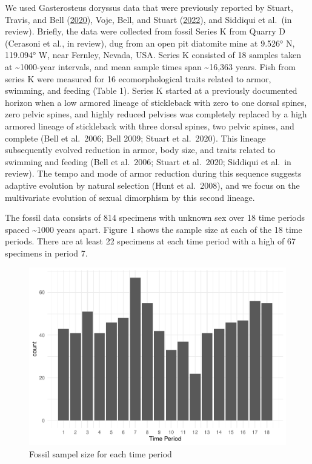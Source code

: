 \documentclass[
  12pt,
]{article}
\begin{document}
We used Gasterosteus doryssus data that were previously reported by
Stuart, Travis, and Bell (\protect\hyperlink{ref-Stuart2020}{2020}),
Voje, Bell, and Stuart (\protect\hyperlink{ref-Voje2022}{2022}), and
Siddiqui et al.~(in review). Briefly, the data were collected from
fossil Series K from Quarry D (Cerasoni et al., in review), dug from an
open pit diatomite mine at 9.526° N, 119.094° W, near Fernley, Nevada,
USA. Series K consisted of 18 samples taken at \textasciitilde1000-year
intervals, and mean sample times span \textasciitilde16,363 years. Fish
from series K were measured for 16 ecomorphological traits related to
armor, swimming, and feeding (Table 1). Series K started at a previously
documented horizon when a low armored lineage of stickleback with zero
to one dorsal spines, zero pelvic spines, and highly reduced pelvises
was completely replaced by a high armored lineage of stickleback with
three dorsal spines, two pelvic spines, and complete (Bell et al.~2006;
Bell 2009; Stuart et al.~2020). This lineage subsequently evolved
reduction in armor, body size, and traits related to swimming and
feeding (Bell et al.~2006; Stuart et al.~2020; Siddiqui et al.~in
review). The tempo and mode of armor reduction during this sequence
suggests adaptive evolution by natural selection (Hunt et al.~2008), and
we focus on the multivariate evolution of sexual dimorphism by this
second lineage.

The fossil data consists of 814 specimens with unknown sex over 18 time
periods spaced \textasciitilde1000 years apart. Figure 1 shows the
sample size at each of the 18 time periods. There are at least 22
specimens at each time period with a high of 67 specimens in period 7.

\begin{figure}

{\centering \includegraphics{paper_files/figure-latex/unnamed-chunk-2-1} 

}

\caption{Fossil sampel size for each time period}\label{fig:unnamed-chunk-2}
\end{figure}
\end{document}
